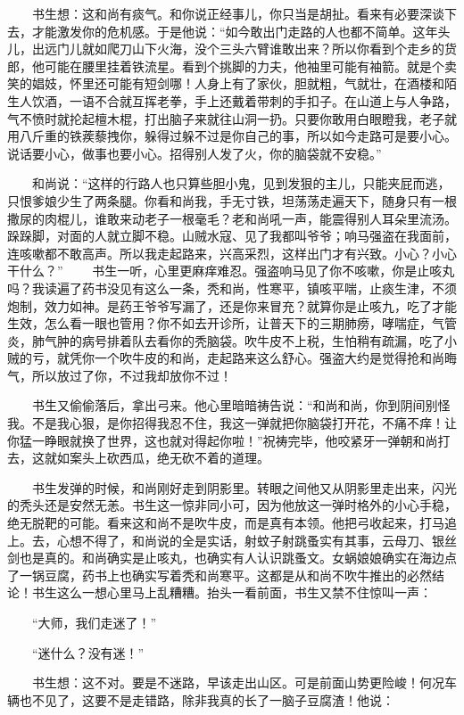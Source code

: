 　　书生想：这和尚有痰气。和你说正经事儿，你只当是胡扯。看来有必要深谈下去，才能激发你的危机感。于是他说：“如今敢出门走路的人也都不简单。这年头儿，出远门儿就如爬刀山下火海，没个三头六臂谁敢出来？所以你看到个走乡的货郎，他可能在腰里挂着铁流星。看到个挑脚的力夫，他袖里可能有袖箭。就是个卖笑的娼妓，怀里还可能有短剑哪！人身上有了家伙，胆就粗，气就壮，在酒楼和陌生人饮酒，一语不合就互挥老拳，手上还戴着带刺的手扣子。在山道上与人争路，气不愤时就抡起檀木棍，打出脑子来就往山洞一扔。只要你敢用白眼瞪我，老子就用八斤重的铁蒺藜拽你，躲得过躲不过是你自己的事，所以如今走路可是要小心。说话要小心，做事也要小心。招得别人发了火，你的脑袋就不安稳。” 

　　和尚说：“这样的行路人也只算些胆小鬼，见到发狠的主儿，只能夹屁而逃，只恨爹娘少生了两条腿。你看和尚我，手无寸铁，坦荡荡走遍天下，随身只有一根撒尿的肉棍儿，谁敢来动老子一根毫毛？老和尚吼一声，能震得别人耳朵里流汤。跺跺脚，对面的人就立脚不稳。山贼水寇、见了我都叫爷爷；响马强盗在我面前，连咳嗽都不敢高声。所以我走起路来，兴高采烈，这样出门才有兴致。小心？小心干什么？” 　　书生一听，心里更麻痒难忍。强盗响马见了你不咳嗽，你是止咳丸吗？我读遍了药书没见有这么一条，秃和尚，性寒平，镇咳平喘，止痰生津，不须炮制，效力如神。是药王爷爷写漏了，还是你来冒充？就算你是止咳九，吃了才能生效，怎么看一眼也管用？你不如去开诊所，让普天下的三期肺痨，哮喘症，气管炎，肺气肿的病号排着队去看你的秃脑袋。吹牛皮不上税，生怕稍有疏漏，吃了小贼的亏，就凭你一个吹牛皮的和尚，走起路来这么舒心。强盗大约是觉得抢和尚晦气，所以放过了你，不过我却放你不过！ 

　　书生又偷偷落后，拿出弓来。他心里暗暗祷告说：“和尚和尚，你到阴间别怪我。不是我心狠，是你招得我忍不住，我这一弹就把你脑袋打开花，不痛不痒！让你猛一睁眼就换了世界，这也就对得起你啦！”祝祷完毕，他咬紧牙一弹朝和尚打去，这就如案头上砍西瓜，绝无砍不着的道理。 

　　书生发弹的时候，和尚刚好走到阴影里。转眼之间他又从阴影里走出来，闪光的秃头还是安然无恙。书生这一惊非同小可，因为他放这一弹时格外的小心手稳，绝无脱靶的可能。看来这和尚不是吹牛皮，而是真有本领。他把弓收起来，打马追上。去，心想不得了，和尚说的全是实话，射蚊子射跳蚤实有其事，云母刀、银丝剑也是真的。和尚确实是止咳丸，也确实有人认识跳蚤文。女蜗娘娘确实在海边点了一锅豆腐，药书上也确实写着秃和尚寒平。这都是从和尚不吹牛推出的必然结论！书生这么一想心里马上乱糟糟。抬头一看前面，书生又禁不住惊叫一声： 

　　“大师，我们走迷了！” 

　　“迷什么？没有迷！” 

　　书生想：这不对。要是不迷路，早该走出山区。可是前面山势更险峻！何况车辆也不见了，这要不是走错路，除非我真的长了一脑子豆腐渣！他说： 

